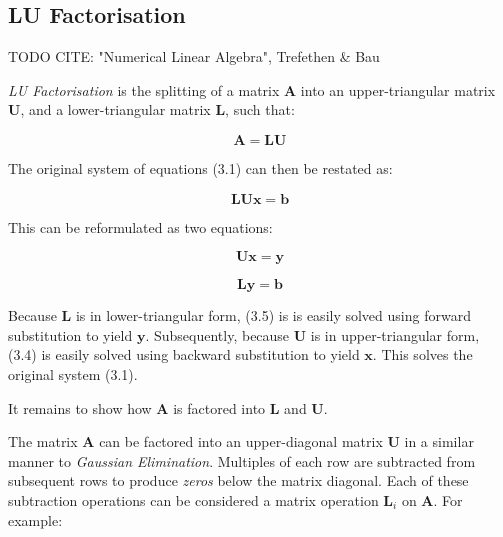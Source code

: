 %
%
\subsection{LU Factorisation}

TODO CITE: "Numerical Linear Algebra", Trefethen \& Bau

\emph{LU Factorisation} is the splitting of a matrix $\mathbf{A}$ into an upper-triangular matrix $\mathbf{U}$, and a lower-triangular matrix $\mathbf{L}$, such that:

\begin{equation}
\mathbf{A}=\mathbf{L}\mathbf{U}
\end{equation}

The original system of equations (3.1) can then be restated as:

\begin{equation}
\mathbf{L}\mathbf{U}\mathbf{x}=\mathbf{b}
\end{equation}

This can be reformulated as two equations:

\begin{equation}
\mathbf{U}\mathbf{x}=\mathbf{y}
\end{equation}

\begin{equation}
\mathbf{L}\mathbf{y}=\mathbf{b}
\end{equation}

Because $\mathbf{L}$ is in lower-triangular form, (3.5) is is easily solved using forward substitution to yield $\mathbf{y}$. Subsequently, because $\mathbf{U}$ is in upper-triangular form, (3.4) is easily solved using backward substitution to yield $\mathbf{x}$. This solves the original system (3.1).

It remains to show how $\mathbf{A}$ is factored into $\mathbf{L}$ and $\mathbf{U}$.

The matrix $\mathbf{A}$ can be factored into an upper-diagonal matrix $\mathbf{U}$ in a similar manner to \emph{Gaussian Elimination}. Multiples of each row are subtracted from subsequent rows to produce \emph{zeros} below the matrix diagonal. Each of these subtraction operations can be considered a matrix operation $\mathbf{L}_i$ on $\mathbf{A}$. For example:

